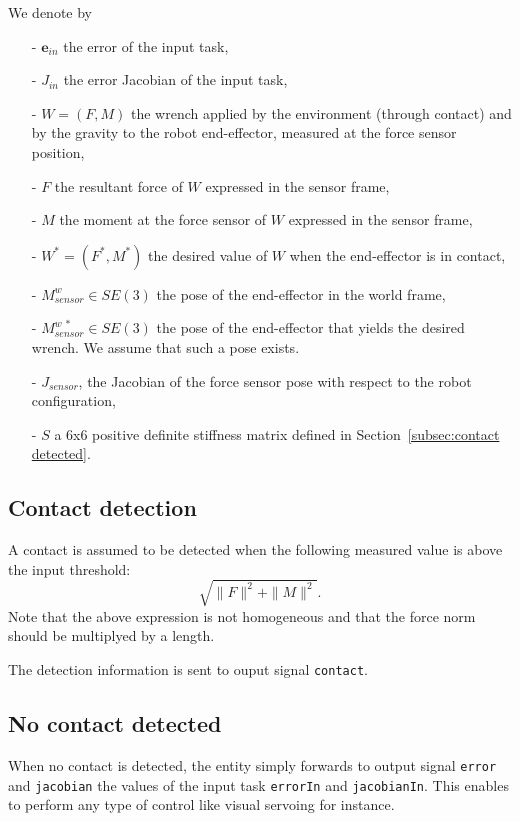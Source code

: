 \documentclass{article}
\newcommand{\oM}[2]{M^{#1}_{#2}}
\newcommand\wrench{W}
\newcommand\resultant{F}
\newcommand\moment{M}
\newcommand\wrenchdes{W^{*}}
\newcommand\resultantdes{F^{*}}
\newcommand\momentdes{M^{*}}
\newcommand\error{\mathbf{e}}
\begin{document}
We denote by
\begin{itemize}
\item [-] $\error_{in}$ the error of the input task,
\item [-] $J_{in}$ the error Jacobian of the input task,
\item[-] $\wrench = (\resultant, \moment)$ the wrench applied by the environment (through contact) and by the gravity to the robot end-effector, measured at the force sensor position,
\item[-] $\resultant$ the resultant force of $\wrench$ expressed in the sensor frame,
\item[-] $\moment$ the moment at the force sensor of $\wrench$ expressed in the sensor frame,
\item[-] $\wrenchdes = (\resultantdes, \momentdes)$ the desired value of $\wrench$ when the end-effector is in contact,
\item[-] $\oM{w}{sensor}\in SE(3)$ the pose of the end-effector in the world frame,
\item[-] $\oM{w\ *}{sensor}\in SE(3)$ the pose of the end-effector that yields the desired wrench. We assume that such a pose exists.
\item[-] $J_{sensor}$, the Jacobian of the force sensor pose with respect to the
  robot configuration,
\item[-] $S$ a 6x6 positive definite stiffness matrix defined in Section~\ref{subsec:contact detected}.
\end{itemize}

\subsection{Contact detection}

A contact is assumed to be detected when the following measured value is above
the input threshold:
$$
\sqrt{\|\resultant\|^2 + \|\moment\|^2}.
$$
Note that the above expression is not homogeneous and that the force norm should
be multiplyed by a length.

The detection information is sent to ouput signal \texttt{contact}.

\subsection{No contact detected}

When no contact is detected, the entity simply forwards to output signal
\texttt{error} and \texttt{jacobian} the values of the input task \texttt{errorIn} and \texttt{jacobianIn}. This enables to perform any type of control like visual servoing for instance.
\end{document}

